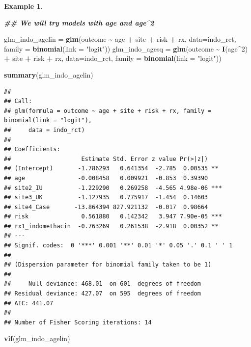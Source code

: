 \documentclass[
  openany]{book}
\newenvironment{Shaded}{\begin{snugshade}}{\end{snugshade}}
\newcommand{\AttributeTok}[1]{\textcolor[rgb]{0.13,0.29,0.53}{#1}}
\newcommand{\DecValTok}[1]{\textcolor[rgb]{0.00,0.00,0.81}{#1}}
\newcommand{\DocumentationTok}[1]{\textcolor[rgb]{0.56,0.35,0.01}{\textbf{\textit{#1}}}}
\newcommand{\FunctionTok}[1]{\textcolor[rgb]{0.13,0.29,0.53}{\textbf{#1}}}
\newcommand{\NormalTok}[1]{#1}
\newcommand{\OtherTok}[1]{\textcolor[rgb]{0.56,0.35,0.01}{#1}}
\newcommand{\SpecialCharTok}[1]{\textcolor[rgb]{0.81,0.36,0.00}{\textbf{#1}}}
\newcommand{\StringTok}[1]{\textcolor[rgb]{0.31,0.60,0.02}{#1}}
\theoremstyle{definition}
\theoremstyle{definition}
\newtheorem{example}{Example}[chapter]
\theoremstyle{definition}
\theoremstyle{definition}
\theoremstyle{remark}
\begin{document}
\begin{example}
\begin{Shaded}
\begin{Highlighting}[]
\DocumentationTok{\#\# We will try models with age and age\^{}2}

\NormalTok{glm\_indo\_agelin }\OtherTok{=} \FunctionTok{glm}\NormalTok{(outcome }\SpecialCharTok{\textasciitilde{}}\NormalTok{ age }\SpecialCharTok{+}\NormalTok{ site }\SpecialCharTok{+}\NormalTok{ risk }\SpecialCharTok{+}\NormalTok{ rx, }\AttributeTok{data=}\NormalTok{indo\_rct, }
                      \AttributeTok{family =} \FunctionTok{binomial}\NormalTok{(}\AttributeTok{link =} \StringTok{"logit"}\NormalTok{))}
\NormalTok{glm\_indo\_agesq }\OtherTok{=} \FunctionTok{glm}\NormalTok{(outcome }\SpecialCharTok{\textasciitilde{}} \FunctionTok{I}\NormalTok{(age}\SpecialCharTok{\^{}}\DecValTok{2}\NormalTok{) }\SpecialCharTok{+}\NormalTok{ site }\SpecialCharTok{+}\NormalTok{ risk }\SpecialCharTok{+}\NormalTok{ rx, }\AttributeTok{data=}\NormalTok{indo\_rct, }
                     \AttributeTok{family =} \FunctionTok{binomial}\NormalTok{(}\AttributeTok{link =} \StringTok{"logit"}\NormalTok{))}

\FunctionTok{summary}\NormalTok{(glm\_indo\_agelin)}
\end{Highlighting}
\end{Shaded}

\begin{verbatim}
## 
## Call:
## glm(formula = outcome ~ age + site + risk + rx, family = binomial(link = "logit"), 
##     data = indo_rct)
## 
## Coefficients:
##                    Estimate Std. Error z value Pr(>|z|)    
## (Intercept)       -1.786293   0.641354  -2.785  0.00535 ** 
## age               -0.008458   0.009921  -0.853  0.39390    
## site2_IU          -1.229290   0.269258  -4.565 4.98e-06 ***
## site3_UK          -1.127935   0.775917  -1.454  0.14603    
## site4_Case       -13.864394 827.921132  -0.017  0.98664    
## risk               0.561880   0.142342   3.947 7.90e-05 ***
## rx1_indomethacin  -0.763269   0.261538  -2.918  0.00352 ** 
## ---
## Signif. codes:  0 '***' 0.001 '**' 0.01 '*' 0.05 '.' 0.1 ' ' 1
## 
## (Dispersion parameter for binomial family taken to be 1)
## 
##     Null deviance: 468.01  on 601  degrees of freedom
## Residual deviance: 427.07  on 595  degrees of freedom
## AIC: 441.07
## 
## Number of Fisher Scoring iterations: 14
\end{verbatim}

\begin{Shaded}
\begin{Highlighting}[]
\FunctionTok{vif}\NormalTok{(glm\_indo\_agelin)}
\end{Highlighting}
\end{Shaded}


\end{example}
\end{document}
